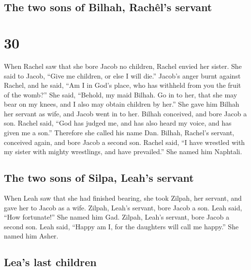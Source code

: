\hypertarget{the-two-sons-of-bilhah-rachuxeals-servant}{%
\subsection{The two sons of Bilhah, Rachêl's
servant}\label{the-two-sons-of-bilhah-rachuxeals-servant}}

\hypertarget{section-29}{%
\section{30}\label{section-29}}

 When Rachel saw that she bore Jacob no children, Rachel
envied her sister. She said to Jacob, ``Give me children, or else I will
die.''  Jacob's anger burnt against Rachel, and he said,
``Am I in God's place, who has withheld from you the fruit of the
womb?''  She said, ``Behold, my maid Bilhah. Go in to her,
that she may bear on my knees, and I also may obtain children by her.''
 She gave him Bilhah her servant as wife, and Jacob went
in to her.  Bilhah conceived, and bore Jacob a son.
 Rachel said, ``God has judged me, and has also heard my
voice, and has given me a son.'' Therefore she called his name Dan.
 Bilhah, Rachel's servant, conceived again, and bore Jacob
a second son.  Rachel said, ``I have wrestled with my
sister with mighty wrestlings, and have prevailed.'' She named him
Naphtali.

\hypertarget{the-two-sons-of-silpa-leahs-servant}{%
\subsection{The two sons of Silpa, Leah's
servant}\label{the-two-sons-of-silpa-leahs-servant}}

 When Leah saw that she had finished bearing, she took
Zilpah, her servant, and gave her to Jacob as a wife. 
Zilpah, Leah's servant, bore Jacob a son.  Leah said,
``How fortunate!'' She named him Gad.  Zilpah, Leah's
servant, bore Jacob a second son.  Leah said, ``Happy am
I, for the daughters will call me happy.'' She named him Asher.

\hypertarget{leas-last-children}{%
\subsection{Lea's last children}\label{leas-last-children}}


